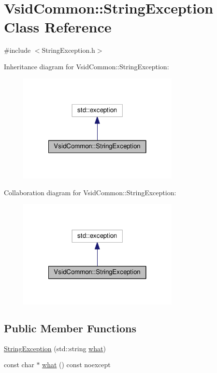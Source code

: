 \hypertarget{class_vsid_common_1_1_string_exception}{\section{Vsid\-Common\-:\-:String\-Exception Class Reference}
\label{class_vsid_common_1_1_string_exception}
}


{\ttfamily \#include $<$String\-Exception.\-h$>$}



Inheritance diagram for Vsid\-Common\-:\-:String\-Exception\-:
\nopagebreak
\begin{figure}[H]
\begin{center}
\leavevmode
\includegraphics[width=230pt]{class_vsid_common_1_1_string_exception__inherit__graph}
\end{center}
\end{figure}


Collaboration diagram for Vsid\-Common\-:\-:String\-Exception\-:
\nopagebreak
\begin{figure}[H]
\begin{center}
\leavevmode
\includegraphics[width=230pt]{class_vsid_common_1_1_string_exception__coll__graph}
\end{center}
\end{figure}
\subsection*{Public Member Functions}
\begin{DoxyCompactItemize}
\item 
\hyperlink{class_vsid_common_1_1_string_exception_a128e663b321974aca5db241aea7f569a}{String\-Exception} (std\-::string \hyperlink{class_vsid_common_1_1_string_exception_aee0da3bd4d08cb375d39defc77ae923c}{what})
\item 
const char $\ast$ \hyperlink{class_vsid_common_1_1_string_exception_aee0da3bd4d08cb375d39defc77ae923c}{what} () const noexcept
\end{DoxyCompactItemize}


